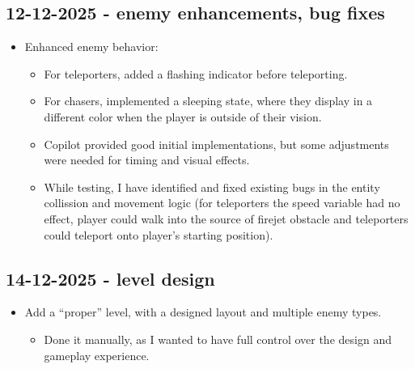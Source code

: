 \documentclass[11pt,a4paper]{article}
\begin{document}
\subsection{12-12-2025 - enemy enhancements, bug fixes}
\begin{itemize}
    \item Enhanced enemy behavior:
    \begin{itemize}
        \item For teleporters, added a flashing indicator before teleporting.
        \item For chasers, implemented a sleeping state, where they display in a different color when the player is outside of their vision.
        \item Copilot provided good initial implementations, but some adjustments were needed for timing and visual effects.
        \item While testing, I have identified and fixed existing bugs in the entity collission and movement logic (for teleporters the speed variable had no effect, player could walk into the source of firejet obstacle and teleporters could teleport onto player's starting position).
    \end{itemize}
\end{itemize}

\subsection{14-12-2025 - level design}
\begin{itemize}
    \item Add a ``proper'' level, with a designed layout and multiple enemy types.
    \begin{itemize}
        \item Done it manually, as I wanted to have full control over the design and gameplay experience.
    \end{itemize}
\end{itemize}
\end{document}
